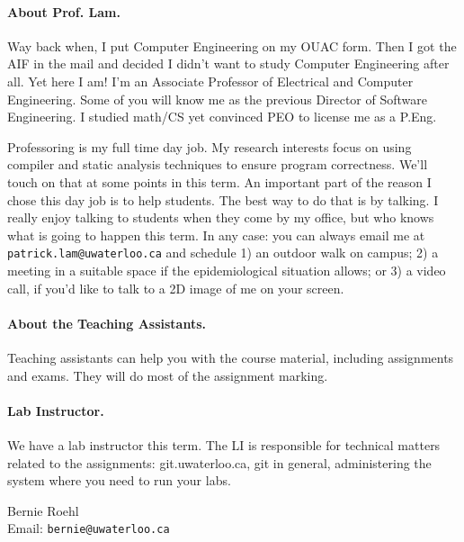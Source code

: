 \documentclass[letterpaper,10pt]{article}
\begin{document}
\paragraph{About Prof. Lam.}
Way back when, I put Computer Engineering on my OUAC form. Then I got the AIF in the mail and decided I didn't want to study Computer Engineering after all. Yet here I am! I'm an Associate Professor of Electrical and Computer Engineering. Some of you will know me as the previous Director of Software Engineering. I studied math/CS yet convinced PEO to license me as a P.Eng.

Professoring is my full time day job. My research interests focus on using compiler and static analysis techniques to ensure program correctness. We'll touch on that at some points in this term. An important part of the reason I chose this day job is to help students. The best way to do that is by talking. I really enjoy talking to students when they come by my office, but who knows what is going to happen this term. In any case: you can always email me at {\tt patrick.lam@uwaterloo.ca} and schedule 1) an outdoor walk on campus; 2) a meeting in a suitable space if the epidemiological situation allows; or 3) a video call, if you'd like to talk to a 2D image of me on your screen.

\paragraph{About the Teaching Assistants.}

Teaching assistants can help you with the course material, including assignments and exams. They will do most of the assignment marking.

\paragraph{Lab Instructor.}
We have a lab instructor this term. The LI is responsible for technical matters related to the assignments: git.uwaterloo.ca, git in general, administering the system where you need to run your labs.

\noindent
\hspace*{2em} \begin{minipage}{.4\textwidth}
Bernie Roehl\\
Email: {\tt bernie@uwaterloo.ca}
\end{minipage}

\newpage

\end{document}
